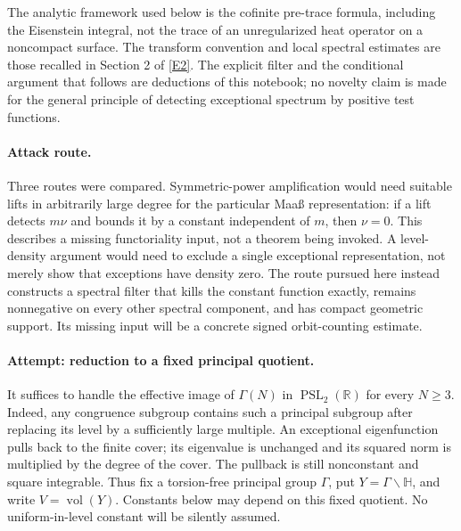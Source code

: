 \documentclass[11pt]{article}
\newcommand{\R}{\mathbb{R}}
\newcommand{\eref}[2]{\hyperlink{extra:#1:#2}{[E#2]}}
\begin{document}
The analytic framework used below is the cofinite pre-trace formula, including
the Eisenstein integral, not the trace of an unregularized heat operator on a
noncompact surface. The transform convention and local spectral estimates are
those recalled in Section 2 of \eref{9400079}{2}. The explicit filter and the
conditional argument that follows are deductions of this notebook; no novelty
claim is made for the general principle of detecting exceptional spectrum by
positive test functions.

\paragraph{Attack route.}
Three routes were compared. Symmetric-power amplification would need suitable
lifts in arbitrarily large degree for the particular Maa\ss{} representation:
if a lift detects $m\nu$ and bounds it by a constant independent of $m$, then
$\nu=0$. This describes a missing functoriality input, not a theorem being
invoked. A level-density argument would need to exclude a single exceptional
representation, not merely show that exceptions have density zero. The route
pursued here instead constructs a spectral filter that kills the constant
function exactly, remains nonnegative on every other spectral component, and
has compact geometric support. Its missing input will be a concrete signed
orbit-counting estimate.

\paragraph{Attempt: reduction to a fixed principal quotient.}
It suffices to handle the effective image of $\Gamma(N)$ in
$\operatorname{PSL}_2(\R)$ for every $N\ge3$. Indeed, any congruence subgroup
contains such a principal subgroup after replacing its level by a sufficiently
large multiple. An exceptional eigenfunction pulls back to the finite cover;
its eigenvalue is unchanged and its squared norm is multiplied by the degree
of the cover. The pullback is still nonconstant and square integrable. Thus
fix a torsion-free principal group $\Gamma$, put
$Y=\Gamma\backslash\mathbb H$, and write $V=\operatorname{vol}(Y)$.
Constants below may depend on this fixed quotient. No uniform-in-level
constant will be silently assumed.
\end{document}
